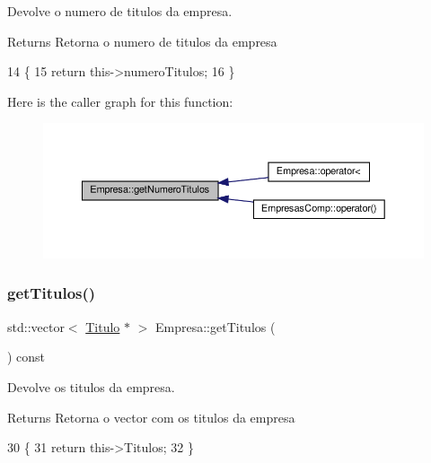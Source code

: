 Devolve o numero de titulos da empresa. 

\begin{DoxyReturn}{Returns}
Retorna o numero de titulos da empresa 
\end{DoxyReturn}

\begin{DoxyCode}
14                                             \{
15     \textcolor{keywordflow}{return} this->numeroTitulos;
16 \}
\end{DoxyCode}
Here is the caller graph for this function\+:
\nopagebreak
\begin{figure}[H]
\begin{center}
\leavevmode
\includegraphics[width=350pt]{classEmpresa_a49b2b94a54bbc341822f64fc194f98fd_icgraph}
\end{center}
\end{figure}
\mbox{\label{classEmpresa_a672f3a89b0e41dd758ab6baf1a8dfbd2}} 
\subsubsection{\texorpdfstring{get\+Titulos()}{getTitulos()}}
{\footnotesize\ttfamily std\+::vector$<$ \hyperlink{classTitulo}{Titulo} $\ast$ $>$ Empresa\+::get\+Titulos (\begin{DoxyParamCaption}{ }\end{DoxyParamCaption}) const}



Devolve os titulos da empresa. 

\begin{DoxyReturn}{Returns}
Retorna o vector com os titulos da empresa 
\end{DoxyReturn}

\begin{DoxyCode}
30                                             \{
31     \textcolor{keywordflow}{return} this->Titulos;
32 \}
\end{DoxyCode}
\mbox{\label{classEmpresa_ab643d752365e59fa1d90a41b8a036d6a}} 
